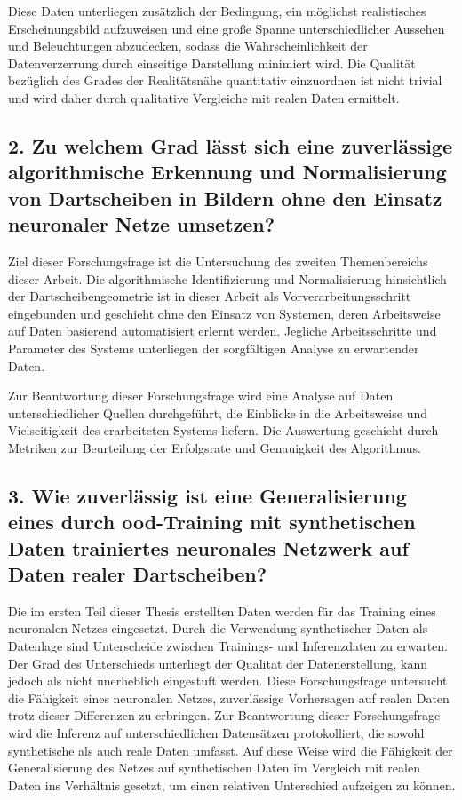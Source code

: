 Diese Daten unterliegen zusätzlich der Bedingung, ein möglichst realistisches Erscheinungsbild aufzuweisen und eine große Spanne unterschiedlicher Aussehen und Beleuchtungen abzudecken, sodass die Wahrscheinlichkeit der Datenverzerrung durch einseitige Darstellung minimiert wird. Die Qualität bezüglich des Grades der Realitätsnähe quantitativ einzuordnen ist nicht trivial und wird daher durch qualitative Vergleiche mit realen Daten ermittelt.

\vspace*{-0.2cm}

\subsection*{2. Zu welchem Grad lässt sich eine zuverlässige algorithmische Erkennung und Normalisierung von Dartscheiben in Bildern ohne den Einsatz neuronaler Netze umsetzen?}

Ziel dieser Forschungsfrage ist die Untersuchung des zweiten Themenbereichs dieser Arbeit. Die algorithmische Identifizierung und Normalisierung hinsichtlich der Dartscheibengeometrie ist in dieser Arbeit als Vorverarbeitungsschritt eingebunden und geschieht ohne den Einsatz von Systemen, deren Arbeitsweise auf Daten basierend automatisiert erlernt werden. Jegliche Arbeitsschritte und Parameter des Systems unterliegen der sorgfältigen Analyse zu erwartender Daten.

Zur Beantwortung dieser Forschungsfrage wird eine Analyse auf Daten unterschiedlicher Quellen durchgeführt, die Einblicke in die Arbeitsweise und Vielseitigkeit des erarbeiteten Systems liefern. Die Auswertung geschieht durch Metriken zur Beurteilung der Erfolgsrate und Genauigkeit des Algorithmus.

\vspace*{-0.2cm}

\subsection*{3. Wie zuverlässig ist eine Generalisierung eines durch \ac{ood}-Training mit synthetischen Daten trainiertes neuronales Netzwerk auf Daten realer Dartscheiben?}

Die im ersten Teil dieser Thesis erstellten Daten werden für das Training eines neuronalen Netzes eingesetzt. Durch die Verwendung synthetischer Daten als Datenlage sind Unterscheide zwischen Trainings- und Inferenzdaten zu erwarten. Der Grad des Unterschieds unterliegt der Qualität der Datenerstellung, kann jedoch als nicht unerheblich eingestuft werden. Diese Forschungsfrage untersucht die Fähigkeit eines neuronalen Netzes, zuverlässige Vorhersagen auf realen Daten trotz dieser Differenzen zu erbringen. Zur Beantwortung dieser Forschungsfrage wird die Inferenz auf unterschiedlichen Datensätzen protokolliert, die sowohl synthetische als auch reale Daten umfasst. Auf diese Weise wird die Fähigkeit der Generalisierung des Netzes auf synthetischen Daten im Vergleich mit realen Daten ins Verhältnis gesetzt, um einen relativen Unterschied aufzeigen zu können.

